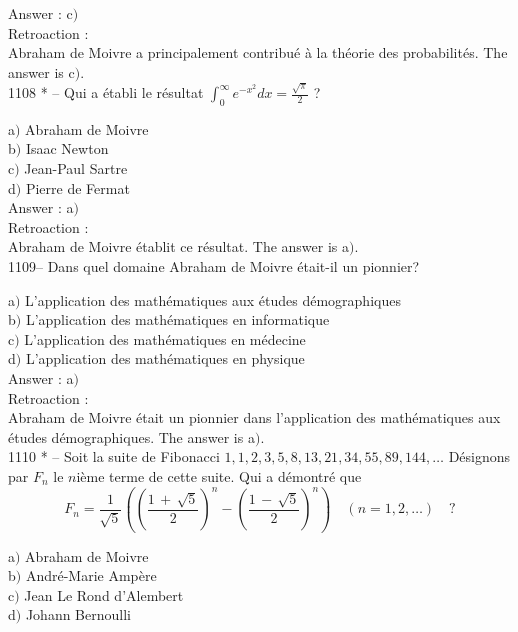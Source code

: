 ﻿\documentclass[letterpaper, 12pt]{article}
\begin{document}
Answer : c$)$\\

Retroaction :\\
Abraham de Moivre a principalement contribu\'e \`a la th\'eorie des
probabilit\'es.
The answer is c$)$.\\

1108 * -- Qui a \'etabli le r\'esultat
$\displaystyle{\int_0^{\infty}e^{-x^2}dx=\frac{\sqrt{\pi}}2}$ ?

a$)$ Abraham de Moivre  \\
b$)$ Isaac Newton \\
c$)$ Jean-Paul Sartre  \\
d$)$ Pierre de Fermat\\

Answer : a$)$\\

Retroaction :\\
Abraham de Moivre \'etablit ce r\'esultat.
The answer is a$)$.\\

1109-- Dans quel domaine Abraham de Moivre \'etait-il un pionnier?

a$)$ L'application des math\'ematiques aux \'etudes d\'emographiques  \\
b$)$ L'application des math\'ematiques en informatique \\
c$)$ L'application des math\'ematiques en m\'edecine  \\
d$)$ L'application des math\'ematiques en physique\\

Answer : a$)$\\

Retroaction :\\
Abraham de Moivre \'etait un pionnier dans l'application des
math\'ematiques aux \'etudes d\'emographiques.
The answer is a$)$.\\

1110 * -- Soit la suite de Fibonacci
$1,1,2,3,5,8,13,21,34,55,89,144, \ldots$ D\'esignons par $F_n$ le
$n$i\`eme terme de cette suite. Qui a d\'emontr\'e que
$$\displaystyle{F_n=\frac1{\sqrt5}\left(\left(\frac{1\,+\,\sqrt5}2\right)^n-\left(\frac{1\,-\,\sqrt5}2\right)^n\right)\quad(n=1,2,\ldots)}\quad?$$

a$)$ Abraham de Moivre \\
b$)$ Andr\'e-Marie Amp\`ere \\
c$)$ Jean Le Rond d'Alembert  \\
d$)$ Johann Bernoulli\\
\end{document}
